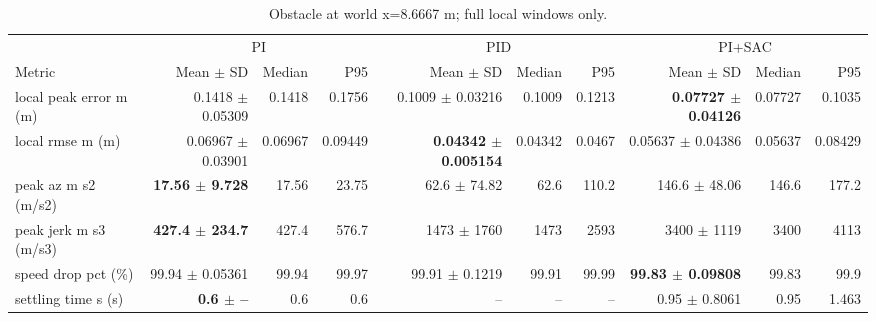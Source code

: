 \begin{table}[t]
\centering
\scriptsize
\caption{Obstacle at world x=8.6667 m; full local windows only.}
\label{tab:obstacle-13}
\begin{tabular}{p{}*{9}{r}}
\toprule
 & \multicolumn{3}{c}{PI} & \multicolumn{3}{c}{PID} & \multicolumn{3}{c}{PI+SAC} \\
\cmidrule(lr){2-4}\cmidrule(lr){5-7}\cmidrule(lr){8-10}
Metric & Mean $\pm$ SD & Median & P95 & Mean $\pm$ SD & Median & P95 & Mean $\pm$ SD & Median & P95 \\
\midrule
local peak error m (m) & 0.1418 $\pm$ 0.05309 & 0.1418 & 0.1756 & 0.1009 $\pm$ 0.03216 & 0.1009 & 0.1213 & \textbf{0.07727 $\pm$ 0.04126} & 0.07727 & 0.1035 \\
local rmse m (m) & 0.06967 $\pm$ 0.03901 & 0.06967 & 0.09449 & \textbf{0.04342 $\pm$ 0.005154} & 0.04342 & 0.0467 & 0.05637 $\pm$ 0.04386 & 0.05637 & 0.08429 \\
peak az m s2 (m/s2) & \textbf{17.56 $\pm$ 9.728} & 17.56 & 23.75 & 62.6 $\pm$ 74.82 & 62.6 & 110.2 & 146.6 $\pm$ 48.06 & 146.6 & 177.2 \\
peak jerk m s3 (m/s3) & \textbf{427.4 $\pm$ 234.7} & 427.4 & 576.7 & 1473 $\pm$ 1760 & 1473 & 2593 & 3400 $\pm$ 1119 & 3400 & 4113 \\
speed drop pct (\%) & 99.94 $\pm$ 0.05361 & 99.94 & 99.97 & 99.91 $\pm$ 0.1219 & 99.91 & 99.99 & \textbf{99.83 $\pm$ 0.09808} & 99.83 & 99.9 \\
settling time s (s) & \textbf{0.6 $\pm$ --} & 0.6 & 0.6 & -- & -- & -- & 0.95 $\pm$ 0.8061 & 0.95 & 1.463 \\
\bottomrule
\end{tabular}
\end{table}
